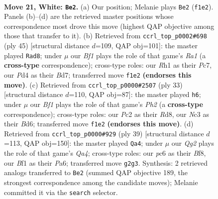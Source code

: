 \documentclass[11pt]{article}
\begin{document}
\clearpage

\begin{figure}[p]\centering
\begin{subfigure}{0.46\textwidth}\centering
\resizebox{\linewidth}{!}{%
\newchessgame
\chessboard[
  setfen={rnb3kr/3n4/2p1p3/pp1p2q1/3P2p1/2N5/PPP2NQP/1K1R1B1R w - - 0 21},
  showmover=false,
  pgfstyle=straightmove, color=movearrow, markmove={f1-e2}
]}
\caption{}
\end{subfigure}\hfill
\begin{subfigure}{0.46\textwidth}\centering
\resizebox{\linewidth}{!}{%
\newchessgame
\chessboard[
  setfen={r3r1k1/1ppb1p1p/p4np1/P3q3/2B1P3/5PP1/1PQ2N1P/R4R1K b - - 1 23},
  showmover=false,
  pgfstyle=straightmove, color=movearrow, markmove={a8-d8}
]}
\caption{}
\end{subfigure}
\\[4pt]
\begin{subfigure}{0.46\textwidth}\centering
\resizebox{\linewidth}{!}{%
\newchessgame
\chessboard[
  setfen={r2r2k1/1p3ppp/p1nbqn2/4p3/1P2P3/P4N1P/1B1NQPP1/2RR2K1 b - - 3 17},
  showmover=false,
  pgfstyle=straightmove, color=movearrow, markmove={h7-h6}
]}
\caption{}
\end{subfigure}\hfill
\begin{subfigure}{0.46\textwidth}\centering
\resizebox{\linewidth}{!}{%
\newchessgame
\chessboard[
  setfen={2kr1b1r/1p1n4/p1p1p1np/q2pP3/5PP1/2P1Q1B1/PP1NN3/R3K2R b KQ - 0 20},
  showmover=false,
  pgfstyle=straightmove, color=movearrow, markmove={a5-a4}
]}
\caption{}
\end{subfigure}
\caption{\textbf{Move 21, White: \texttt{Be2}.} (a) Our position; Melanie plays \texttt{Be2} (\texttt{f1e2}). Panels (b)--(d) are the retrieved master positions whose correspondence most drove this move (highest QAP objective among those that transfer to it). (b) Retrieved from \texttt{ccrl\_top\_p0002\#698} (ply 45) [structural distance $d$=109, QAP obj=101]: the master played \texttt{Rad8}; under $\mu$ our \emph{Bf1} plays the role of that game's \emph{Ra1} (a \textbf{cross-type} correspondence); cross-type roles: our \emph{R}h1 as their \emph{P}c7, our \emph{P}d4 as their \emph{B}d7; transferred move \texttt{f1e2} \textbf{(endorses this move)}. (c) Retrieved from \texttt{ccrl\_top\_p0000\#2507} (ply 33) [structural distance $d$=110, QAP obj=87]: the master played \texttt{h6}; under $\mu$ our \emph{Bf1} plays the role of that game's \emph{Ph2} (a \textbf{cross-type} correspondence); cross-type roles: our \emph{P}c2 as their \emph{R}d8, our \emph{N}c3 as their \emph{B}d6; transferred move \texttt{f1e2} \textbf{(endorses this move)}. (d) Retrieved from \texttt{ccrl\_top\_p0000\#929} (ply 39) [structural distance $d$=113, QAP obj=150]: the master played \texttt{Qa4}; under $\mu$ our \emph{Qg2} plays the role of that game's \emph{Qa4}; cross-type roles: our \emph{p}c6 as their \emph{B}f8, our \emph{B}f1 as their \emph{P}a6; transferred move \texttt{g2g3}. Synthesis: 2 retrieved analogs transferred to \texttt{Be2} (summed QAP objective 189, the strongest correspondence among the candidate moves); Melanie committed it via the \texttt{search} selector.}
\label{fig:thought-m40}
\end{figure}
\end{document}
